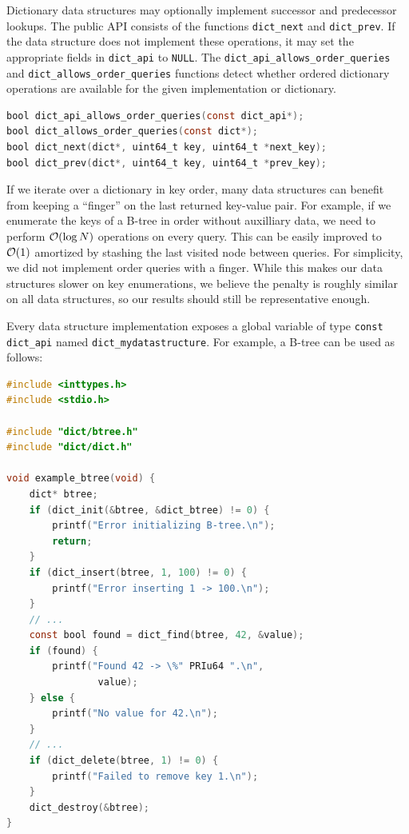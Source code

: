 Dictionary data structures may optionally implement successor and predecessor
lookups. The public API consists of the functions \texttt{dict\_next} and
\texttt{dict\_prev}. If the data structure does not implement these operations,
it may set the appropriate fields in \texttt{dict\_api} to \texttt{NULL}.
The \texttt{dict\_api\_allows\_order\_queries} and
\texttt{dict\_allows\_order\_queries} functions detect whether ordered
dictionary operations are available for the given implementation or dictionary.
\begin{lstlisting}[language=C]
bool dict_api_allows_order_queries(const dict_api*);
bool dict_allows_order_queries(const dict*);
bool dict_next(dict*, uint64_t key, uint64_t *next_key);
bool dict_prev(dict*, uint64_t key, uint64_t *prev_key);
\end{lstlisting}
If we iterate over a dictionary in key order, many data structures can benefit
from keeping a ``finger'' on the last returned key-value pair. For example,
if we enumerate the keys of a B-tree in order without auxilliary data, we need
to perform $\mathcal{O}(\log N)$ operations on every query. This can be easily improved
to $\mathcal{O}(1)$ amortized by stashing the last visited node between queries.
For simplicity, we did not implement order queries with a finger. While this
makes our data structures slower on key enumerations, we believe the penalty
is roughly similar on all data structures, so our results should still be
representative enough.

Every data structure implementation exposes a global variable of type
\texttt{const dict\_api} named \texttt{dict\_mydatastructure}. For example,
a B-tree can be used as follows:

\begin{lstlisting}[language=C]
#include <inttypes.h>
#include <stdio.h>

#include "dict/btree.h"
#include "dict/dict.h"

void example_btree(void) {
	dict* btree;
	if (dict_init(&btree, &dict_btree) != 0) {
		printf("Error initializing B-tree.\n");
		return;
	}
	if (dict_insert(btree, 1, 100) != 0) {
		printf("Error inserting 1 -> 100.\n");
	}
	// ...
	const bool found = dict_find(btree, 42, &value);
	if (found) {
		printf("Found 42 -> \%" PRIu64 ".\n",
				value);
	} else {
		printf("No value for 42.\n");
	}
	// ...
	if (dict_delete(btree, 1) != 0) {
		printf("Failed to remove key 1.\n");
	}
	dict_destroy(&btree);
}
\end{lstlisting}

